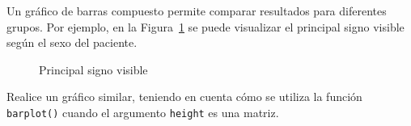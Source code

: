 \documentclass{prob}
\begin{document}
	\begin{problema}
	Un gráfico de barras compuesto permite comparar resultados para diferentes grupos. Por ejemplo, en la Figura~\ref{fig:plot03} se puede visualizar el principal signo visible según el sexo del paciente.
\begin{figure}[!ht]
    \centering
    
    \caption{Principal signo visible}
    \label{fig:plot03}
\end{figure}	

	Realice un gráfico similar, teniendo en cuenta cómo se utiliza la función \texttt{barplot()} cuando el argumento \texttt{height} es una matriz. 

	\end{problema}

	\newpage
	
\end{document}
